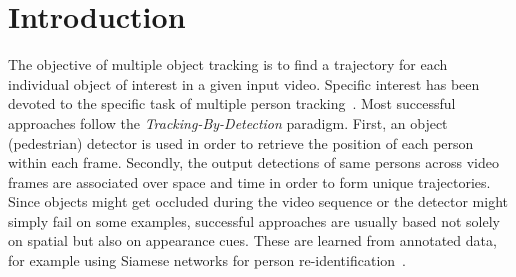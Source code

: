 \section{Introduction}

The objective of multiple object tracking is to find a trajectory for each individual object of interest in a given input video. 
Specific interest has been devoted to the specific task of multiple person tracking~\cite{zamir2012gmcp,henschel2017improvements,tang2016multi,tang2017multiple,luo2014multiple}. 
Most successful approaches follow the \textit{Tracking-By-Detection} paradigm.
First, an object (pedestrian) detector is used in order to retrieve the position of each person within each frame. 
Secondly, the output detections of same persons across video frames are associated over space and time in order to form unique trajectories. 
Since objects might get occluded during the video sequence or the detector might simply fail on some examples, successful approaches are usually based not solely on spatial but also on appearance cues. These are learned from annotated data, for example using Siamese networks for person re-identification~\cite{tang2017multiple}.\\

